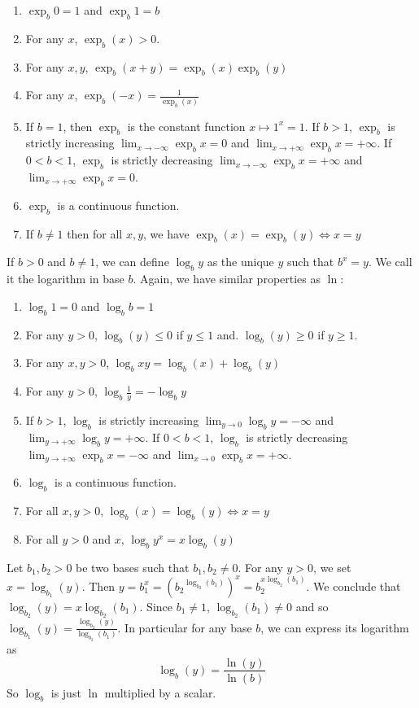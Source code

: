 \begin{enumerate}
\item $\exp_b{0} = 1$ and $\exp_b{1} = b$
\item For any $x$, $\exp_b{(x)} > 0$.
\item For any $x,y$, $\exp_b{(x+y)} = \exp_b{(x)} \exp_b{(y)}$
\item For any $x$, $\exp_b{(-x)} = \frac{1}{\exp_b{(x)}}$
\item
  If $b = 1$, then $\exp_b$ is the constant function $x \mapsto 1^x = 1$.
  If $b > 1$, $\exp_b$ is strictly increasing
  $\lim_{x \rightarrow -\infty} \exp_b{x} = 0$ and
  $\lim_{x \rightarrow +\infty} \exp_b{x} = +\infty$.
  If $0 < b < 1$, $\exp_b$ is strictly decreasing
  $\lim_{x \rightarrow -\infty} \exp_b{x} = +\infty$ and
  $\lim_{x \rightarrow +\infty} \exp_b{x} = 0$.
\item $\exp_b$ is a continuous function.
\item If $b \neq 1$ then for all $x,y$, we have
  $\exp_b{(x)} = \exp_b{(y)} \iff x = y$
\end{enumerate}

If $b > 0$ and $b \neq 1$, we can define $\log_b{y}$ as the unique $y$ such that
$b^x = y$. We call it the logarithm in base $b$.
Again, we have similar properties as $\ln$:

\begin{enumerate}
\item $\log_b{1} = 0$ and $\log_b{b} = 1$
\item For any $y > 0$, $\log_b{(y)} \leq 0$ if $y \leq 1$ and.
  $\log_b{(y)} \geq 0$ if $y \geq 1$.
\item For any $x,y > 0$, $\log_b{xy} = \log_b{(x)} + \log_b{(y)}$
\item For any $y > 0$, $\log_b{\frac{1}{y}} = -\log_b{y}$
\item If $b > 1$, $\log_b$ is strictly increasing
  $\lim_{y \rightarrow 0} \log_b{y} = -\infty$ and
  $\lim_{y \rightarrow +\infty} \log_b{y} = +\infty$.
  If $0 < b < 1$, $\log_b$ is strictly decreasing
  $\lim_{y \rightarrow +\infty} \exp_b{x} = -\infty$ and
  $\lim_{x \rightarrow 0} \exp_b{x} = +\infty$.
\item $\log_b$ is a continuous function.
\item For all $x,y > 0$, $\log_b{(x)} = \log_b{(y)} \iff x = y$
\item For all $y > 0$ and $x$, $\log_b{y^x} = x \log_b{(y)}$
\end{enumerate}

Let $b_1, b_2 > 0$ be two bases such that $b_1,b_2\neq0$.
For any $y > 0$, we set $x = \log_{b_1}{(y)}$.
Then $y = b_1^x = \left(b_2{^{\log_{b_2}{(b_1)}}}\right)^x =
b_2^{x \log_{b_2}{(b_1)}}$. We conclude that
$\log_{b_2}{(y)} = x \log_{b_2}{(b_1)}$. Since $b_1 \neq 1$,
$\log_{b_2}{(b_1)} \neq 0$ and so
$\log_{b_1}{(y)} = \frac{\log_{b_2}{(y)}}{\log_{b_2}{(b_1)}}$. In particular for
any base $b$, we can express its logarithm as
%
$$\log_{b}{(y)} = \frac{\ln{(y)}}{\ln{(b)}}$$
%
So $\log_b$ is just $\ln$ multiplied by a scalar.

